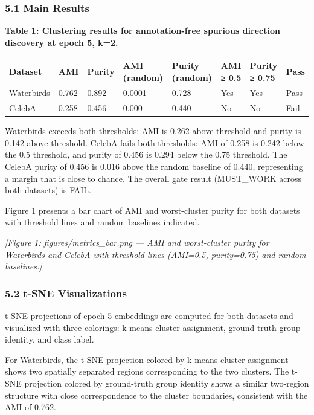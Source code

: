 
\subsubsection{5.1 Main Results}

\textbf{Table 1: Clustering results for annotation-free spurious direction discovery at epoch 5, k=2.}

\begin{table}[htbp]
\centering
\begin{tabular}{llllllll}
\toprule
Dataset & AMI & Purity & AMI (random) & Purity (random) & AMI ≥ 0.5 & Purity ≥ 0.75 & Pass \\
\midrule
Waterbirds & 0.762 & 0.892 & 0.0001 & 0.728 & Yes & Yes & Pass \\
CelebA & 0.258 & 0.456 & 0.000 & 0.440 & No & No & Fail \\
\bottomrule
\end{tabular}
\end{table}

Waterbirds exceeds both thresholds: AMI is 0.262 above threshold and purity is 0.142 above threshold. CelebA fails both thresholds: AMI of 0.258 is 0.242 below the 0.5 threshold, and purity of 0.456 is 0.294 below the 0.75 threshold. The CelebA purity of 0.456 is 0.016 above the random baseline of 0.440, representing a margin that is close to chance. The overall gate result (MUST_WORK across both datasets) is FAIL.

Figure 1 presents a bar chart of AMI and worst-cluster purity for both datasets with threshold lines and random baselines indicated.

\textit{[Figure 1: figures/metrics_bar.png — AMI and worst-cluster purity for Waterbirds and CelebA with threshold lines (AMI=0.5, purity=0.75) and random baselines.]}

\subsubsection{5.2 t-SNE Visualizations}

t-SNE projections of epoch-5 embeddings are computed for both datasets and visualized with three colorings: k-means cluster assignment, ground-truth group identity, and class label.

For Waterbirds, the t-SNE projection colored by k-means cluster assignment shows two spatially separated regions corresponding to the two clusters. The t-SNE projection colored by ground-truth group identity shows a similar two-region structure with close correspondence to the cluster boundaries, consistent with the AMI of 0.762.

